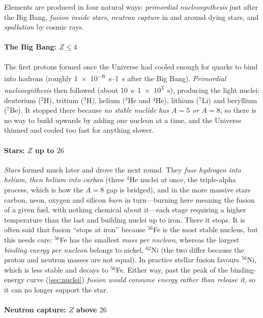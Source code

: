     Elements are produced in four natural ways: \emph{primordial nucleosynthesis} just after the Big Bang, \emph{fusion inside stars}, \emph{neutron capture} in and around dying stars, and \emph{spallation} by cosmic rays.

    \paragraph{The Big Bang: $Z \leq 4$}

    The first protons formed once the Universe had cooled enough for quarks to bind into hadrons (roughly \qtyrange{1e-6}{1}{\second} after the Big Bang). \emph{Primordial nucleosynthesis} then followed (about \qtyrange{10}{1e3}{\second}), producing the light nuclei: deuterium ($^{2}$H), tritium ($^{3}$H), helium ($^{3}$He and $^{4}$He), lithium ($^{7}$Li) and beryllium ($^{7}$Be). It stopped there because \emph{no stable nuclide has $A = 5$ or $A = 8$,} so there is no way to build upwards by adding one nucleon at a time, and the Universe thinned and cooled too fast for anything slower.

    \paragraph{Stars: $Z$ up to $26$}

    \emph{Stars} formed much later and drove the next round. They \emph{fuse hydrogen into helium, then helium into carbon} (three $^{4}$He nuclei at once, the triple-alpha process, which is how the $A=8$ gap is bridged), and in the more massive stars carbon, neon, oxygen and silicon \emph{burn} in turn---burning here meaning the fusion of a given fuel, with nothing chemical about it---each stage requiring a higher temperature than the last and building nuclei up to iron. There it stops. It is often said that fusion \enquote{stops at iron} because $^{56}$Fe is the most stable nucleus, but this needs care: $^{56}$Fe has the smallest \emph{mass per nucleon}, whereas the largest \emph{binding energy per nucleon} belongs to nickel, $^{62}$Ni (the two differ because the proton and neutron masses are not equal). In practice stellar fusion favours $^{56}$Ni, which is less stable and decays to $^{56}$Fe. Either way, past the peak of the binding-energy curve (\cref{sec:nuclei}) \emph{fusion would consume energy rather than release it}, so it can no longer support the star.

    \paragraph{Neutron capture: $Z$ above $26$}


